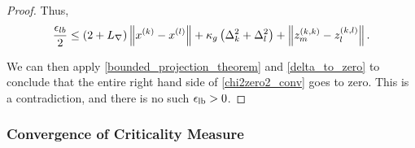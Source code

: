 \begin{proof}



Thus,
\begin{align}
\frac{\epsilon_{lb}} 2 \le \left(2 + {L_{\nabla}}\right) \left\|x^{(k)} - {x^{(l)}}\right\| 
+ \kappa_g \left(\Delta_k^2 + \Delta_l^2\right)
+ \left\|{z_m^{(k, k)}} - {z_l^{(k, l)}}\right\|.
\label{chi2zero2_conv}
\end{align}

We can then apply \cref{bounded_projection_theorem} and \cref{delta_to_zero} to conclude that the entire right hand side of \cref{chi2zero2_conv} goes to zero.
This is a contradiction, and there is no such ${\epsilon_{\textrm{lb}}} > 0$.
\end{proof}

\subsubsection{Convergence of Criticality Measure}
\label{limit_of_true_criticality}


